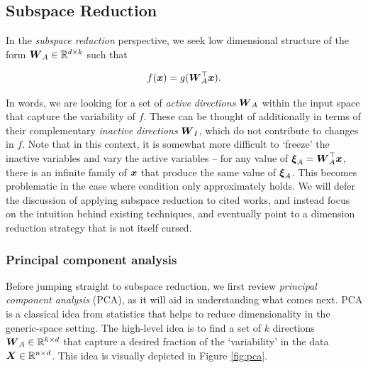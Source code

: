 \documentclass{article}
\begin{document}
\subsection{Subspace Reduction}
In the \emph{subspace reduction} perspective, we seek low dimensional structure
of the form $\boldsymbol{W}_A\in\mathbb{R}^{d\times k}$ such that

\begin{equation} \label{eq:ridge}
  f(\boldsymbol{x}) = g(\boldsymbol{W}_A^{\top}\boldsymbol{x}).
\end{equation}

\noindent In words, we are looking for a set of \emph{active directions} $\boldsymbol{W}_A$
within the input space that capture the variability of $f$. These can be thought
of additionally in terms of their complementary \emph{inactive directions}
$\boldsymbol{W}_I$, which do not contribute to changes in $f$. Note that in this context,
it is somewhat more difficult to `freeze' the inactive variables and vary the
active variables -- for any value of $\boldsymbol{\xi}_A = \boldsymbol{W}_A^{\top}\boldsymbol{x}$, there is an
infinite family of $\boldsymbol{x}$ that produce the same value of $\boldsymbol{\xi}_A$. This becomes
problematic in the case where condition \label{eq:ridge} only approximately
holds.\cite{constantine2015} We will defer the discussion of applying subspace
reduction to cited works, and instead focus on the intuition behind existing
techniques, and eventually point to a dimension reduction strategy that is not
itself cursed.

\subsubsection{Principal component analysis}
Before jumping straight to subspace reduction, we first review \emph{principal
  component analysis} (PCA), as it will aid in understanding what comes next.
PCA is a classical idea from statistics that helps to reduce dimensionality in
the generic-space setting. The high-level idea is to find a set of $k$
directions $\boldsymbol{W}_A\in\mathbb{R}^{k\times d}$ that capture a desired fraction of the
`variability' in the data $\boldsymbol{X}\in\mathbb{R}^{n\times d}$. This idea is visually depicted
in Figure \ref{fig:pca}.
\end{document}
